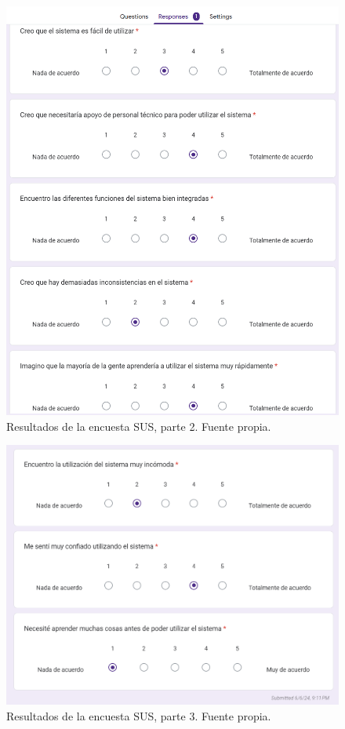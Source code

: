         \begin{figure}[h]
        \centering
        \includegraphics[width=1\textwidth]{img/encuesta2.png}
        \caption{Resultados de la encuesta SUS, parte 2. Fuente propia.}
        \label{fig:encuesta2}
    \end{figure}
        \begin{figure}[h]
        \centering
        \includegraphics[width=1\textwidth]{img/encuesta3.png}
        \caption{Resultados de la encuesta SUS, parte 3. Fuente propia.}
        \label{fig:encuesta3}
    \end{figure}
